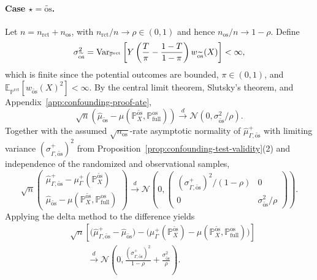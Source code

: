 \paragraph{Case \(\star=\widetilde{\mathrm{os}}\).}
Let \(n=n_{\mathrm{rct}}+n_{\mathrm{os}}\), with \(n_{\mathrm{rct}}/n\to\rho\in(0,1)\) and hence \(n_{\mathrm{os}}/n\to 1-\rho\). Define
\[
  \sigma_{\widetilde{\mathrm{os}}}^2
  =
  \operatorname{Var}_{\mathbb{P}^{\mathrm{rct}}}
  \left[
    Y
    \left(
      \frac{T}{\pi}
      -
      \frac{1-T}{1-\pi}
    \right)
    w_{\widetilde{\mathrm{os}}}(X)
  \right]
  < \infty,
\]
which is finite since the potential outcomes are bounded, \(\pi\in(0,1)\), and \(\mathbb{E}_{\mathbb{P}^{\mathrm{rct}}}[w_{\widetilde{\mathrm{os}}}(X)^2]<\infty\). By the central limit theorem, Slutsky's theorem, and Appendix~\ref{app:confounding-proof-ate},
\[
  \sqrt{n}
  \left(
    \widehat{\mu}_{\widetilde{\mathrm{os}}}
    -
    \mu(\mathbb{P}^{\widetilde{\mathrm{os}}}_X,\mathbb{P}^{\mathrm{os}}_{\mathrm{full}})
  \right)
  \xrightarrow{d}
  \mathcal{N}(0,\sigma_{\widetilde{\mathrm{os}}}^2/\rho).
\]
Together with the assumed \(\sqrt{n_{\mathrm{os}}}\)-rate asymptotic normality of \(\widehat{\mu}^+_{\Gamma,\widetilde{\mathrm{os}}}\) with limiting variance \((\sigma^+_{\Gamma,\widetilde{\mathrm{os}}})^2\) from Proposition~\ref{prop:confounding-test-validity}(2) and independence of the randomized and observational samples,
\[
  \sqrt{n}
  \begin{pmatrix}
    \widehat{\mu}^+_{\Gamma,\widetilde{\mathrm{os}}}
    -
    \mu^+_{\Gamma}(\mathbb{P}^{\widetilde{\mathrm{os}}}_X) \\
    \widehat{\mu}_{\widetilde{\mathrm{os}}}
    -
    \mu(\mathbb{P}^{\widetilde{\mathrm{os}}}_X,\mathbb{P}^{\mathrm{os}}_{\mathrm{full}})
  \end{pmatrix}
  \xrightarrow{d}
  \mathcal{N}
  \left(
    0,
    \begin{pmatrix}
      (\sigma^+_{\Gamma,\widetilde{\mathrm{os}}})^2/(1-\rho) & 0 \\
      0 & \sigma_{\widetilde{\mathrm{os}}}^2/\rho
    \end{pmatrix}
  \right).
\]
Applying the delta method to the difference yields
\[
\begin{aligned}
  &\sqrt{n}
  \left[
    \bigl(
      \widehat{\mu}^+_{\Gamma,\widetilde{\mathrm{os}}}
      -
      \widehat{\mu}_{\widetilde{\mathrm{os}}}
    \bigr)
    -
    \bigl(
      \mu^+_{\Gamma}(\mathbb{P}^{\widetilde{\mathrm{os}}}_X)
      -
      \mu(\mathbb{P}^{\widetilde{\mathrm{os}}}_X,\mathbb{P}^{\mathrm{os}}_{\mathrm{full}})
    \bigr)
  \right] \\
  &\qquad\xrightarrow{d}
  \mathcal{N}
  \left(
    0,
    \frac{(\sigma^+_{\Gamma,\widetilde{\mathrm{os}}})^2}{1-\rho}
    +
    \frac{\sigma_{\widetilde{\mathrm{os}}}^2}{\rho}
  \right).
\end{aligned}
\]
